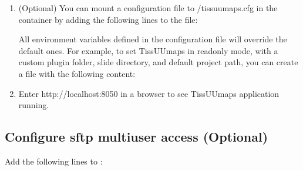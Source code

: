 \documentclass[letterpaper,10pt,english,openany,oneside]{sphinxmanual}
\begin{document}
\begin{enumerate}
\item {} 
\sphinxAtStartPar
(Optional) You can mount a configuration file to /tissuumaps.cfg in the container by adding the following lines to the  file:

\begin{sphinxVerbatim}[commandchars=\\\{\}]
\end{sphinxVerbatim}

\sphinxAtStartPar
All environment variables defined in the configuration file will override the default ones. For example, to set TissUUmaps in read\sphinxhyphen{}only mode, with a custom plugin folder, slide directory, and default project path, you can create a  file with the following content:

\begin{sphinxVerbatim}[commandchars=\\\{\}]
\end{sphinxVerbatim}

\item {} 
\sphinxAtStartPar
Enter http://localhost:8050 in a browser to see TissUUmaps application running.

\end{enumerate}


\subsection{Configure sftp multi\sphinxhyphen{}user access (Optional)}
\label{\detokenize{docs/sharing/docker:configure-sftp-multi-user-access-optional}}
\sphinxAtStartPar
Add the following lines to :
\end{document}
